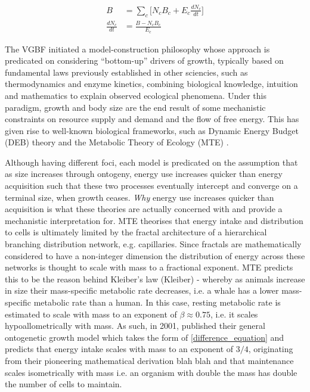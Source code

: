 \documentclass[a4paper]{article} %
\begin{document}
            \begin{align*}
                B &= \sum_c \Bigg[N_{c}B_{c} + E_{c}\frac{dN_{c}}{dt}\Bigg] \\
                \frac{dN_{c}}{dt} &= \frac{B - N_{c}B_{c}}{E_{c}}
            \end{align*}
            
            The VGBF initiated a model-construction philosophy whose approach is predicated on considering ``bottom-up'' drivers of growth, typically based on fundamental laws previously established in other sciencies, such as thermodynamics and enzyme kinetics, combining biological knowledge, intuition and mathematics to explain observed ecological phenomena. Under this paradigm, growth and body size are the end result of some mechanistic constraints on resource supply and demand and the flow of free energy. This has given rise to well-known biological frameworks, such as Dynamic Energy Budget (DEB) theory \autocite{kooijman2010dynamic} and the Metabolic Theory of Ecology (MTE) \autocite{Brown2004}. 
            
            Although having different foci, each model is predicated on the assumption that as size increases through ontogeny, energy use increases quicker than energy acquisition such that these two processes eventually intercept and converge on a terminal size, when growth ceases. \textit{Why} energy use increases quicker than acquisition is what these theories are actually concerned with and provide a mechanistic interpretation for. MTE theorises that energy intake and distribution to cells is ultimately limited by the fractal architecture of a hierarchical branching distribution network, e.g. capillaries. Since fractals are mathematically considered to have a non-integer dimension \autocite{Hausdorff1918, Mandelbrot1982} the distribution of energy across these networks is thought to scale with mass to a fractional exponent.  MTE predicts this to be the reason behind Kleiber's law (Kleiber) - whereby as animals increase in size their mass-specific metabolic rate decreases, i.e. a whale has a lower mass-specific metabolic rate than a human. In this case, resting metabolic rate is estimated to scale with mass to an exponent of $\beta \approx 0.75$, i.e. it scales hypoallometrically with mass. As such, in 2001, \cite{West2001} published their general ontogenetic growth model 
            which takes the form of \eqref{difference_equation} and predicts that energy intake scales with mass to an exponent of $3/4$, originating from their pioneering mathematical derivation blah blah and that maintenance scales isometrically with mass i.e. an organism with double the mass has double the number of cells to maintain.
            
\end{document}
